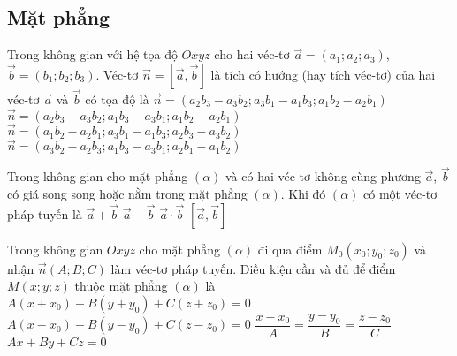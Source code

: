 \subsection{Mặt phẳng}
\begin{ex}%
	Trong không gian với hệ tọa độ $Oxyz$ cho hai véc-tơ $\vec{a}=(a_1;a_2;a_3)$, $\vec{b}=(b_1;b_2;b_3)$. Véc-tơ $\vec{n}=\left[\vec{a},\vec{b}\right]$ là tích có hướng (hay tích véc-tơ) của hai véc-tơ $\vec{a}$ và $\vec{b}$ có tọa độ là
	\choice
	{\True $\vec{n}=(a_2b_3-a_3b_2;a_3b_1-a_1b_3;a_1b_2-a_2b_1)$}
	{$\vec{n}=(a_2b_3-a_3b_2;a_1b_3-a_3b_1;a_1b_2-a_2b_1)$}
	{$\vec{n}=(a_1b_2-a_2b_1;a_3b_1-a_1b_3;a_2b_3-a_3b_2)$}
	{$\vec{n}=(a_3b_2-a_2b_3;a_1b_3-a_3b_1;a_2b_1-a_1b_2)$}
\end{ex}
\begin{ex}%
	Trong không gian cho mặt phẳng $(\alpha)$ và có hai véc-tơ không cùng phương $\vec{a}$, $\vec{b}$ có giá song song hoặc nằm trong mặt phẳng $(\alpha)$. Khi đó $(\alpha)$ có một véc-tơ pháp tuyến là
	\choice
	{$\vec{a}+\vec{b}$}
	{$\vec{a}-\vec{b}$}
	{$\vec{a}\cdot\vec{b}$}
	{\True $\left[\vec{a},\vec{b}\right]$}
\end{ex}
\begin{ex}%
	Trong không gian $Oxyz$ cho mặt phẳng $(\alpha)$ đi qua điểm $M_0(x_0;y_0;z_0)$ và nhận $\vec{n}(A;B;C)$ làm véc-tơ pháp tuyến. Điều kiện cần và đủ để điểm $M(x;y;z)$ thuộc mặt phẳng $(\alpha)$ là
	\choice
	{$A(x+x_0)+B(y+y_0)+C(z+z_0)=0$}
	{\True $A(x-x_0)+B(y-y_0)+C(z-z_0)=0$}
	{$\dfrac{x-x_0}{A}=\dfrac{y-y_0}{B}=\dfrac{z-z_0}{C}$}
	{$Ax+By+Cz=0$}
\end{ex}
